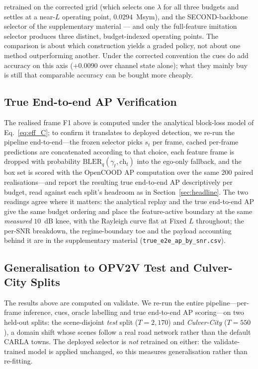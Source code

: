 \documentclass[journal]{IEEEtran}
\begin{document}
retrained on the corrected grid (which selects one $\lambda$ for all three budgets and settles at a near-$L$ operating point, $0.0294$~Msym), and the SECOND-backbone selector of the supplementary material --- and only the full-feature imitation selector produces three distinct, budget-indexed operating points. The comparison is about which construction yields a graded policy, not about one method outperforming another.
Under the corrected convention the cues do add accuracy on this axis ($+0.0090$ over channel state alone); what they mainly buy is still that comparable accuracy can be bought more cheaply.

\subsection{True End-to-end AP Verification}\label{sec:true_e2e}

The realised frame F1 above is computed under the analytical block-loss model of
Eq.~\eqref{eq:eff_C}; to confirm it translates to deployed detection, we re-run the pipeline
end-to-end---the frozen selector picks $s_t$ per frame, cached per-frame predictions are
concatenated according to that choice, each feature frame is dropped with probability
$\mathrm{BLER}_q(\gamma_t,\mathrm{ch}_t)$ into the ego-only fallback, and the box set is scored with
the OpenCOOD AP computation over the same $200$ paired realisations---and report the resulting true
end-to-end AP descriptively per budget, read against each split's headroom as in
Section~\ref{sec:headline}. The two readings agree where it matters: the analytical replay and the
true end-to-end AP give the same budget ordering and place the feature-active boundary at the same
\emph{measured} $10$~dB knee, with the Rayleigh curve flat at Fixed $L$ throughout; the per-SNR
breakdown, the regime-boundary toe and the payload accounting behind it are in the supplementary
material (\texttt{true\_e2e\_ap\_by\_snr.csv}).

\subsection{Generalisation to OPV2V Test and Culver-City Splits}\label{sec:generalisation}

The results above are computed on validate. We re-run the entire pipeline---per-frame inference, cues, oracle labelling and true end-to-end AP scoring---on two held-out splits: the scene-disjoint \emph{test} split ($T=2{,}170$) and \emph{Culver-City} ($T=550$), a domain shift whose scenes follow a real road network rather than the default CARLA towns. The deployed selector is \emph{not} retrained on either: the validate-trained model is applied unchanged, so this measures generalisation rather than re-fitting.
\end{document}
